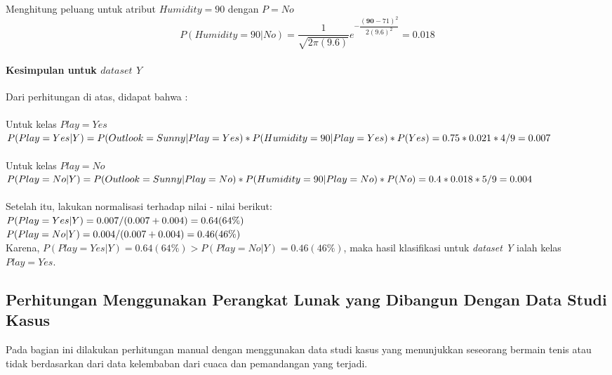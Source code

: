 	Menghitung peluang untuk atribut $Humidity=90$ dengan $P=No$
		\begin{equation}
			P(Humidity=90|No)
			= \dfrac{1}{\sqrt{2\pi(9.6)}}e^{-\dfrac{(\textbf{90}-71)^2}{2(9.6)^2}} 
			= 0.018
		\end{equation}
		
	\paragraph{Kesimpulan untuk $dataset$ $Y$}
	Dari perhitungan di atas, didapat bahwa : \\ \\
	Untuk kelas $Play=Yes$ \\
	$P(Play=Yes|Y) \\
	= P(Outlook=Sunny|Play=Yes)*P(Humidity=90|Play=Yes)*P(Yes) \\
	= 0.75 * 0.021 * 4/9 \\
	= 0.007$ \\ \\
	Untuk kelas $Play=No$ \\
	$P(Play=No|Y) \\
	= P(Outlook=Sunny|Play=No)*P(Humidity=90|Play=No)*P(No) \\
	= 0.4 * 0.018 * 5/9 \\
	= 0.004$ \\ \\
	Setelah itu, lakukan normalisasi terhadap nilai - nilai berikut: \\
	$P(Play=Yes|Y) = 0.007 / (0.007+0.004) \\
	= 0.64 (64\%)$ \\
	$P(Play=No|Y) = 0.004 / (0.007+0.004) \\
	= 0.46 (46\%)$ \\
	
	Karena, $P(Play=Yes|Y) = 0.64 (64\%) > P(Play=No|Y) = 0.46 (46\%)$, maka hasil klasifikasi untuk \textit{dataset Y} ialah kelas $Play=Yes$.
	

\subsection{Perhitungan Menggunakan Perangkat Lunak yang Dibangun Dengan Data Studi Kasus}
\label{subsec:Perhitungan Menggunakan Perangkat Lunak yang Dibangun Dengan Data Studi Kasus}

Pada bagian ini dilakukan perhitungan manual dengan menggunakan data studi kasus yang menunjukkan seseorang bermain tenis atau tidak berdasarkan dari data kelembaban dari cuaca dan pemandangan yang terjadi.

